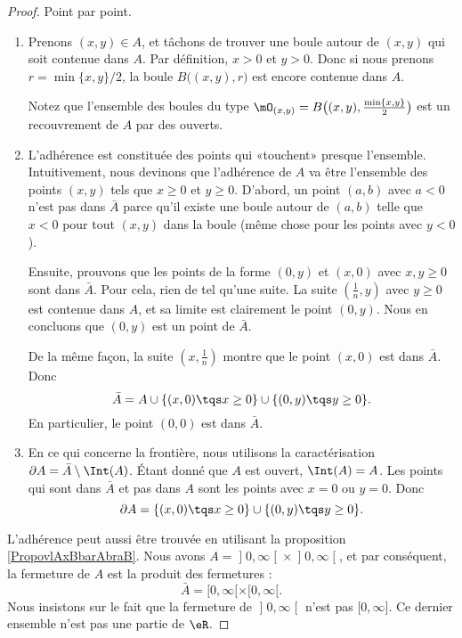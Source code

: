 \begin{proof}
	Point par point.
	\begin{enumerate}
		\item

		      Prenons $(x,y)\in A$, et tâchons de trouver une boule autour de $(x,y)$ qui soit contenue dans $A$. Par définition, $x>0$ et $y>0$. Donc si nous prenons $r=\min\{ x,y \}/2$, la boule $B\big( (x,y),r \big)$ est encore contenue dans $A$.

		      Notez que l'ensemble des boules du type $\mO_{(x,y)}=B\big( (x,y),\frac{ \min\{ x,y \} }{ 2 } \big)$ est un recouvrement de $A$ par des ouverts.

		\item
		      L'adhérence est constituée des points qui «touchent» presque l'ensemble. Intuitivement, nous devinons que l'adhérence de $A$ va être l'ensemble des points $(x,y)$ tels que $x\geq 0$ et $y\geq 0$. D'abord, un point $(a,b)$ avec $a<0$ n'est pas dans $\bar A$ parce qu'il existe une boule autour de $(a,b)$ telle que $x<0$ pour tout $(x,y)$ dans la boule (même chose pour les points avec $y<0$).

		      Ensuite, prouvons que les points de la forme $(0,y)$ et $(x,0)$ avec $x,y\geq 0$ sont dans $\bar A$. Pour cela, rien de tel qu'une suite. La suite $(\frac{1}{ n },y)$ avec $y\geq 0$ est contenue dans $A$, et sa limite est clairement le point $(0,y)$. Nous en concluons que $(0,y)$ est un point de $\bar A$.

		      De la même façon, la suite $(x,\frac{1}{ n })$ montre que le point $(x,0)$ est dans $\bar A$. Donc
		      \begin{equation}
			      \bar A=A\cup\{ (x,0)\tqs x\geq 0 \}\cup\{ (0,y)\tqs y\geq 0\}.
		      \end{equation}
		      En particulier, le point $(0,0)$ est dans $\bar A$.

		\item
		      En ce qui concerne la frontière, nous utilisons la caractérisation $\partial A=\bar A\setminus\Int(A)$. Étant donné que $A$ est ouvert, $\Int(A)=A$. Les points qui sont dans $\bar A$ et pas dans $A$ sont les points avec $x=0$ ou $y=0$. Donc
		      \begin{equation}
			      \partial A=\{ (x,0)\tqs x\geq 0 \}\cup\{ (0,y)\tqs y\geq 0\}.
		      \end{equation}

	\end{enumerate}

	L'adhérence peut aussi être trouvée en utilisant la proposition \ref{PropovlAxBbarAbraB}. Nous avons $A=\mathopen] 0 , \infty \mathclose[\times\mathopen] 0 , \infty \mathclose[$, et par conséquent, la fermeture de $A$ est la produit des fermetures :
				\begin{equation}
					\bar A=\mathopen[ 0 , \infty [\times\mathopen[ 0 , \infty [.
				\end{equation}
				Nous insistons sur le fait que la fermeture de $\mathopen] 0 , \infty \mathclose[$ n'est pas $\mathopen[ 0 , \infty \mathclose]$. Ce dernier ensemble n'est pas une partie de $\eR$.
\end{proof}

